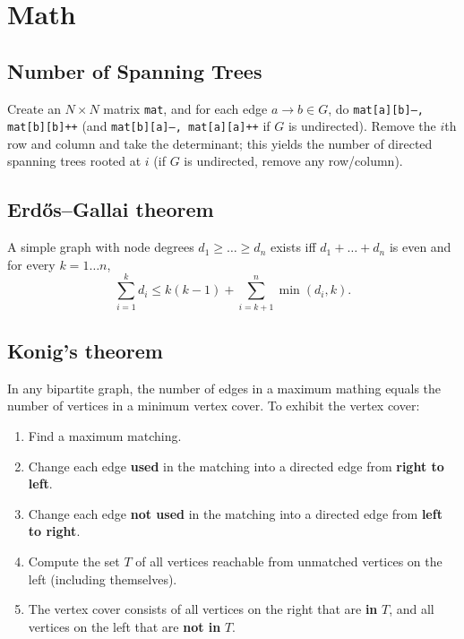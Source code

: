 \section{Math}
	\subsection{Number of Spanning Trees}
		Create an $N\times N$ matrix \texttt{mat}, and for each edge $a \rightarrow b \in G$, do
		\texttt{mat[a][b]--, mat[b][b]++} (and \texttt{mat[b][a]--, mat[a][a]++} if $G$ is undirected).
		Remove the $i$th row and column and take the determinant; this yields the number of directed spanning trees rooted at $i$
		(if $G$ is undirected, remove any row/column).

	\subsection{Erdős–Gallai theorem}
		A simple graph with node degrees $d_1 \ge \dots \ge d_n$ exists iff $d_1 + \dots + d_n$ is even and for every $k = 1\dots n$,
		\[ \sum _{i=1}^{k}d_{i}\leq k(k-1)+\sum _{i=k+1}^{n}\min(d_{i},k). \]

	\subsection{Konig's theorem}
  In any bipartite graph, the number of edges in a maximum mathing equals the number of vertices in a minimum vertex cover. To exhibit the vertex cover:\\
  \begin{enumerate}
  \item
  Find a maximum matching.
  \item
  Change each edge {\bf used} in the matching into a directed edge from {\bf right to left}.
  \item
  Change each edge {\bf not used} in the matching into a directed edge from {\bf left to right}.
  \item
  Compute the set $T$ of all vertices reachable from unmatched vertices on the left (including themselves).
  \item
  The vertex cover consists of all vertices on the right that are {\bf in} $T$, and all vertices on the left
  that are {\bf not in} $T$.
  \end{enumerate}

